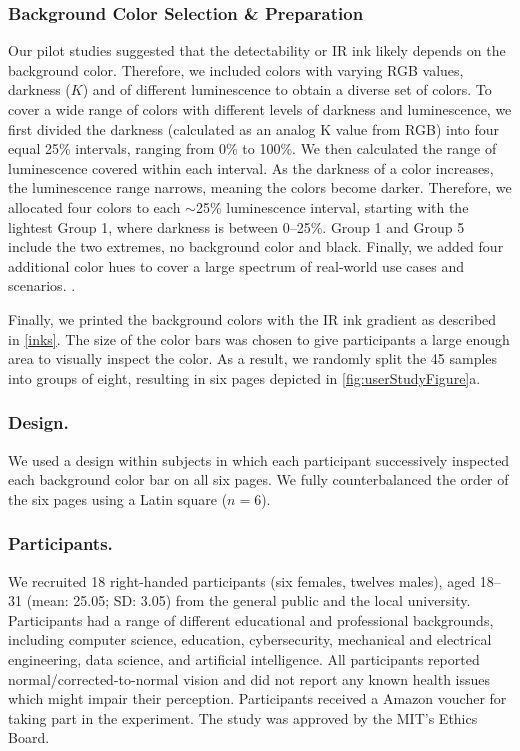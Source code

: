 \subsubsection{Background Color Selection \& Preparation}
Our pilot studies suggested that the detectability or IR ink likely depends on the background color. Therefore, we included colors with varying RGB values, darkness ($K$) and of different luminescence to obtain a diverse set of colors. To cover a wide range of colors with different levels of darkness and luminescence, we first divided the darkness (calculated as an analog K value from RGB) into four equal 25\% intervals, ranging from 0\% to 100\%.
We then calculated the range of luminescence covered within each interval. As the darkness of a color increases, the luminescence range narrows, meaning the colors become darker. Therefore, we allocated four colors to each $\sim$25\% luminescence interval, starting with the lightest  Group 1, where darkness is between 0--25\%. Group 1 and Group 5 include the two extremes, no background color and black. Finally, we added four additional color hues to cover a large spectrum of real-world use cases and scenarios. 
.





Finally, we printed the background colors with the IR ink gradient as described in \autoref{inks}. The size of the color bars was chosen to give participants a large enough area to visually inspect the color. As a result, we randomly split the 45 samples into groups of eight, resulting in six pages depicted in \autoref{fig:userStudyFigure}a.


\subsubsection{Design.}
We used a design within subjects in which each participant successively inspected each background color bar on all six pages. We fully counterbalanced the order of the six pages using a Latin square ($n = 6$).


\subsubsection{Participants.}
We recruited 18 right-handed participants (six females, twelves males), aged 18--31 (mean: 25.05; SD: 3.05) from the general public and the local university. Participants had a range of different educational and professional backgrounds, including computer science, education, cybersecurity, mechanical and electrical engineering, data science, and artificial intelligence. All participants reported normal/corrected-to-normal vision and did not report any known health issues which might impair their perception. Participants received a   Amazon voucher for taking part in the experiment. The study was approved by the MIT's Ethics Board.

